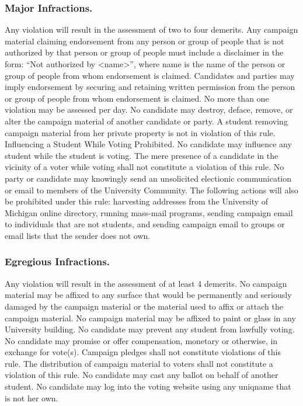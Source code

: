 \subsubsection{Major Infractions.}
Any violation will result in the assessment of two to four demerits.
Any campaign material claiming endorsement from any person or group of people that is not authorized by that person or group of people must include a disclaimer in the form: ``Not authorized by <name>'', where name is the name of the person or group of people from whom endorsement is claimed.  Candidates and parties may imply endorsement by securing and retaining written permission from the person or group of people from whom endorsement is claimed. No more than one violation may be assessed per day.
No candidate may destroy, deface, remove, or alter the campaign material of another candidate or party. A student removing campaign material from her private property is not in violation of this rule.
Influencing a Student While Voting Prohibited.  No candidate may influence any student while the student is voting. The mere presence of a candidate in the vicinity of a voter while voting shall not constitute a violation of this rule. 
No party or candidate may knowingly send an unsolicited electionic  communication or email to members of the University Community. The following actions will also be prohibited under this rule: harvesting addresses from the University of Michigan online directory, running mass-mail programs, sending campaign email to individuals that are not students, and sending campaign email to groups or email lists that the sender does not own.

\subsubsection{Egregious Infractions.}
Any violation will result in the assessment of at least 4 demerits.
No campaign material may be affixed to any surface that would be permanently and seriously damaged by the campaign material or the material used to affix or attach the campaign material. No campaign material may be affixed to paint or glass in any University building.
No candidate may prevent any student from lawfully voting.
No candidate may promise or offer compensation, monetary or otherwise, in exchange for vote(s).  Campaign pledges shall not constitute violations of this rule. The distribution of campaign material to voters shall not constitute a violation of this rule.
No candidate may cast any ballot on behalf of another student. No candidate may log into the voting website using any uniqname that is not her own.



